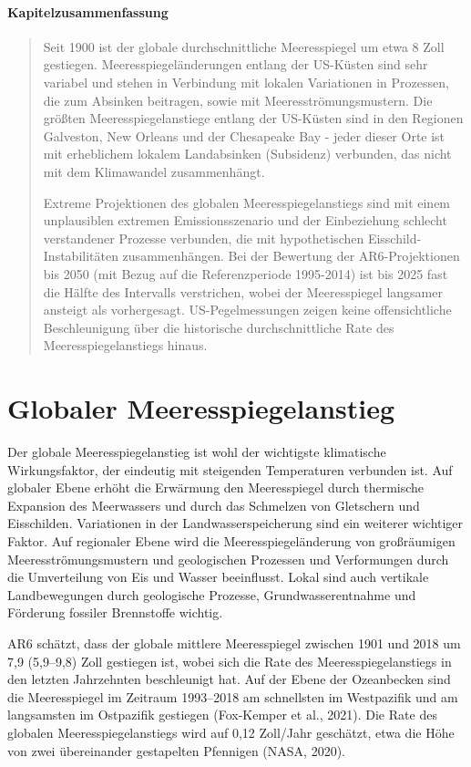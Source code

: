 \documentclass[12pt,paper=a4,DIV=12,parskip=never,chapterprefix=false,headings=standardclasses]{scrreprt}
\begin{document}
\paragraph{Kapitelzusammenfassung}
\begin{quote}
Seit 1900 ist der globale durchschnittliche Meeresspiegel um etwa 8 Zoll gestiegen. Meeresspiegeländerungen entlang der US-Küsten sind sehr variabel und stehen in Verbindung mit lokalen Variationen in Prozessen, die zum Absinken beitragen, sowie mit Meeresströmungsmustern. Die größten Meeresspiegelanstiege entlang der US-Küsten sind in den Regionen Galveston, New Orleans und der Chesapeake Bay - jeder dieser Orte ist mit erheblichem lokalem Landabsinken (Subsidenz) verbunden, das nicht mit dem Klimawandel zusammenhängt.

Extreme Projektionen des globalen Meeresspiegelanstiegs sind mit einem unplausiblen extremen Emissionsszenario und der Einbeziehung schlecht verstandener Prozesse verbunden, die mit hypothetischen Eisschild-Instabilitäten zusammenhängen. Bei der Bewertung der AR6-Projektionen bis 2050 (mit Bezug auf die Referenzperiode 1995-2014) ist bis 2025 fast die Hälfte des Intervalls verstrichen, wobei der Meeresspiegel langsamer ansteigt als vorhergesagt. US-Pegelmessungen zeigen keine offensichtliche Beschleunigung über die historische durchschnittliche Rate des Meeresspiegelanstiegs hinaus.
\end{quote}

\section{Globaler Meeresspiegelanstieg}
Der globale Meeresspiegelanstieg ist wohl der wichtigste klimatische Wirkungsfaktor, der eindeutig mit steigenden Temperaturen verbunden ist. Auf globaler Ebene erhöht die Erwärmung den Meeresspiegel durch thermische Expansion des Meerwassers und durch das Schmelzen von Gletschern und Eisschilden. Variationen in der Landwasserspeicherung sind ein weiterer wichtiger Faktor. Auf regionaler Ebene wird die Meeresspiegeländerung von großräumigen Meeresströmungsmustern und geologischen Prozessen und Verformungen durch die Umverteilung von Eis und Wasser beeinflusst. Lokal sind auch vertikale Landbewegungen durch geologische Prozesse, Grundwasserentnahme und Förderung fossiler Brennstoffe wichtig.

AR6 schätzt, dass der globale mittlere Meeresspiegel zwischen 1901 und 2018 um 7,9 (5,9–9,8) Zoll gestiegen ist, wobei sich die Rate des Meeresspiegelanstiegs in den letzten Jahrzehnten beschleunigt hat. Auf der Ebene der Ozeanbecken sind die Meeresspiegel im Zeitraum 1993–2018 am schnellsten im Westpazifik und am langsamsten im Ostpazifik gestiegen (Fox-Kemper et al., 2021). Die Rate des globalen Meeresspiegelanstiegs wird auf 0,12 Zoll/Jahr geschätzt, etwa die Höhe von zwei übereinander gestapelten Pfennigen (NASA, 2020).
\end{document}
